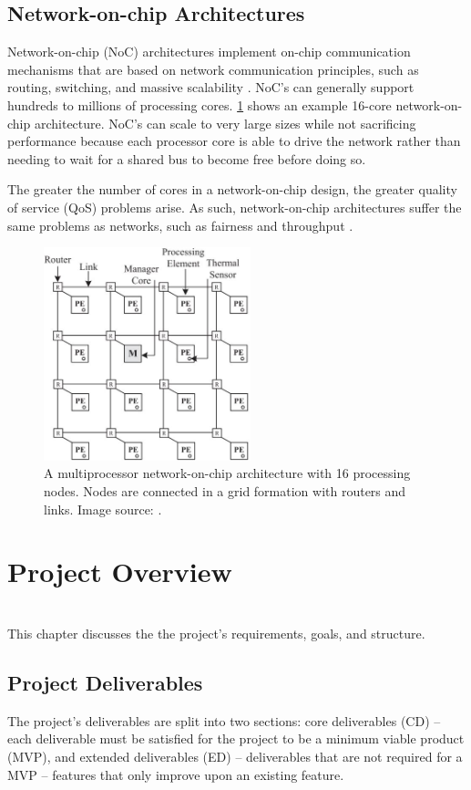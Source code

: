 \section{Network-on-chip Architectures}
Network-on-chip (NoC) architectures implement on-chip communication mechanisms that are based on network communication  principles, such as routing, switching, and massive scalability \cite{newnoc}. NoC's can generally support hundreds to millions of processing cores.
\cref{fig:noc} shows an example 16-core network-on-chip architecture. 
NoC's can scale to very large sizes while not sacrificing performance because each processor core is able to drive the network rather than needing to wait for a shared bus to become free before doing so.

The greater the number of cores in a network-on-chip design, the greater quality of service (QoS) problems arise. As such, network-on-chip architectures suffer the same problems as networks, such as fairness and throughput \cite{nocfairness}.


\begin{figure}[h]
\centering
\includegraphics[width=6cm]{../img/noc}
\caption{A multiprocessor network-on-chip architecture with 16 processing nodes. Nodes are connected in a grid formation with routers and links. Image source: \cite{noc}.}
\label{fig:noc}
\end{figure}

\chapter{Project Overview}
{%
\startcontents[chapters]
}
\noindent\\
This chapter discusses the the project's requirements, goals, and structure.

\section{Project Deliverables}
\label{sect:goals}
The project's deliverables are split into two sections: core deliverables (CD) -- each deliverable must be satisfied for the project to be a minimum viable product (MVP), and extended deliverables (ED) -- deliverables that are not required for a MVP -- features that only improve upon an existing feature.

